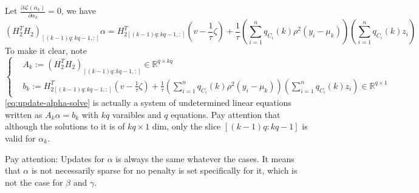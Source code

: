\documentclass[12pt, a4paper, oneside]{article}
\numberwithin{equation}{section}
\begin{document}
Let $\frac{\partial \mathcal{L}(\alpha_k)}{\partial \alpha_k} = 0$, we have 
\begin{equation}
\label{eq:update-alpha-solve}
(H_2^T H_2)_{[(k-1)q:kq-1,:]}\alpha = H_{2{[(k-1)q:kq-1,:]}}^T (v-\frac{1}{\tau}\zeta) + \frac{1}{\tau}\left(\displaystyle\sum_{i=1}^{n}q_{C_i}(k)\rho^2(y_i-\mu_k)\right)\left(\displaystyle\sum_{i=1}^{n}q_{C_i}(k)z_i\right)
\end{equation}
To make it clear, note
\begin{equation}
\label{eq:update-alpha-note}
\left\{
\begin{aligned}
&A_k:= (H_2^T H_2)_{[(k-1)q:kq-1,:]}\in \mathbb{R}^{q\times kq} \\
&b_k:=H_{2{[(k-1)q:kq-1,:]}}^T (v-\frac{1}{\tau}\zeta) + \frac{1}{\tau}\left(\displaystyle\sum_{i=1}^{n}q_{C_i}(k)\rho^2(y_i-\mu_k)\right)\left(\displaystyle\sum_{i=1}^{n}q_{C_i}(k)z_i\right) \in\mathbb{R}^{q\times 1}
\end{aligned}
\right.
\end{equation}
\ref{eq:update-alpha-solve} is actually a system of undetermined linear equations written as $A_k\alpha = b_k$ with $kq$ varaibles and $q$ equations. Pay attention that although the solutions to it is of $kq\times 1$ dim, only the slice $[(k-1)q:kq-1]$ is valid for $\alpha_k$.

Pay attention: Updates for $\alpha$ is always the same whatever the cases. It means that $\alpha$ is not necessarily sparse for no penalty is set specifically for it, which is not the case for $\beta$ and $\gamma$.
\end{document}

